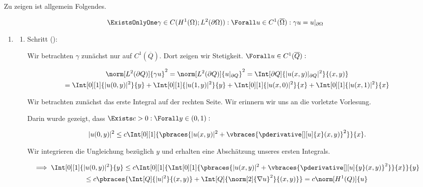 \begin{solution}

Zu zeigen ist allgemein Folgendes.

\begin{align*}
  \ExistsOnlyOne \gamma \in C
  (
    H^1(\Omega);
    L^2(\partial \Omega)
  ):
  \Forall u \in C^1(\overline{\Omega}):
  \gamma u = u|_{\partial \Omega}
\end{align*}

\begin{enumerate}[label = \textbf{\alph*)}]

  \item

  \begin{enumerate}[label = \arabic*.]

    \item Schritt ():

    Wir betrachten $\gamma$ zunächst nur auf $C^1(\overline{Q})$.
    Dort zeigen wir Stetigkeit.
    $\Forall u \in C^1(\overline{Q}):$

    \begin{multline*}
      \norm[L^2(\partial Q)]{\gamma u}^2
      =
      \norm[L^2(\partial Q)]{u|_{\partial Q}}^2
      =
      \Int[\partial Q]{|u(x, y)|_{\partial Q}|^2}{(x, y)} \\
      =
      \Int[0][1]{|u(0, y)|^2}{y}
      +
      \Int[0][1]{|u(1, y)|^2}{y}
      +
      \Int[0][1]{|u(x, 0)|^2}{x}
      +
      \Int[0][1]{|u(x, 1)|^2}{x}
    \end{multline*}

    Wir betrachten zunächst das erste Integral auf der rechten Seite.
    Wir erinnern wir uns an die vorletzte Vorlesung.


    Darin wurde gezeigt, dass $\Exists c > 0: \Forall y \in (0, 1):$

    \begin{align*}
      |u(0, y)|^2
      \leq
      c
      \Int[0][1]
      {
        \pbraces
        {
          |u(x, y)|^2
          +
          \vbraces
          {
            \pderivative[][u]{x}(x, y)
          }^2
        }
      }{x}.
    \end{align*}

    Wir integrieren die Ungleichung bezüglich $y$ und erhalten eine Abschätzung unseres ersten Integrals.

    \begin{multline*}
      \implies
      \Int[0][1]{|u(0, y)|^2}{y}
      \leq
      c
      \Int[0][1]
      {
        \Int[0][1]
        {
          \pbraces
          {
            |u(x, y)|^2
            +
            \vbraces
            {
              \pderivative[][u]{y}(x, y)
            }^2
          }
        }{x}
      }{y} \\
      \leq
      c
      \pbraces
      {
        \Int[Q]{|u|^2}{(x, y)}
        +
        \Int[Q]{\norm[2]{\nabla u}^2}{(x, y)}
      }
      =
      c \norm[H^1(Q)]{u}
    \end{multline*}


\end{enumerate}
\end{enumerate}
\end{solution}

